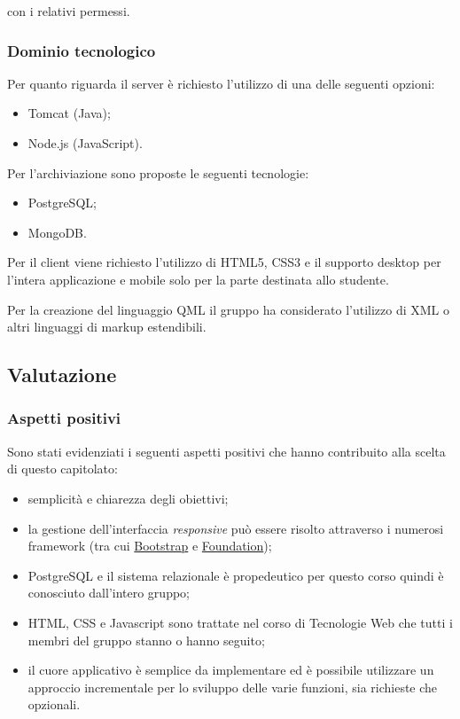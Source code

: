 \documentclass[12pt,a4paper]{article}
\begin{document}
con i relativi permessi.

\subsubsection{Dominio tecnologico}

Per quanto riguarda il server è richiesto l'utilizzo di una delle seguenti opzioni:

\begin{itemize}
\item Tomcat (Java);
\item Node.js (JavaScript).
\end{itemize}

Per l'archiviazione sono proposte le seguenti tecnologie:

\begin{itemize}
\item PostgreSQL;
\item MongoDB.
\end{itemize}

Per il client viene richiesto l'utilizzo di HTML5, CSS3 e il supporto desktop per l'intera applicazione e mobile
solo per la parte destinata allo studente.

Per la creazione del linguaggio QML il gruppo ha considerato l'utilizzo di XML o altri linguaggi di markup
estendibili.

\subsection{Valutazione}
\subsubsection{Aspetti positivi}

Sono stati evidenziati i seguenti aspetti positivi che hanno contribuito alla scelta di
questo capitolato:

\begin{itemize}
\item semplicità e chiarezza degli obiettivi;
\item la gestione dell'interfaccia \textit{responsive} può essere risolto attraverso i numerosi
    framework (tra cui \href{http://getbootstrap.com}{Bootstrap} e \href{http://foundation.zurb.com}{Foundation});
\item PostgreSQL e il sistema relazionale è propedeutico per questo corso quindi è conosciuto dall'intero gruppo;
\item HTML, CSS e Javascript sono trattate nel corso di Tecnologie Web che tutti i membri del gruppo stanno o hanno
seguito;
\item il cuore applicativo è semplice da implementare ed è possibile utilizzare un approccio incrementale
per lo sviluppo delle varie funzioni, sia richieste che opzionali.
\end{itemize}
\end{document}
